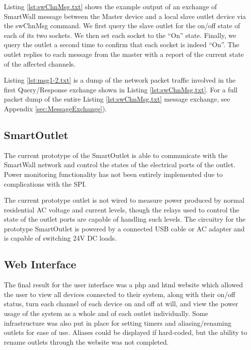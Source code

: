 \documentclass[11pt]{article}
\begin{document}


Listing \ref{lst:swChnMsg.txt} shows the example output of an exchange
of SmartWall message between the Master device and a local slave
outlet device via the swChnMsg command. We first query the slave
outlet for the on/off state of each of its two sockets. We then set
each socket to the ``On'' state. Finally, we query the outlet a second
time to confirm that each socket is indeed ``On''. The outlet replies
to each message from the master with a report of the current state of
the affected channels.



Listing \ref{lst:msg1-2.txt} is a dump of the network packet traffic
involved in the first Query/Response exchange shown in Listing
\ref{lst:swChnMsg.txt}. For a full packet dump of the entire
Listing \ref{lst:swChnMsg.txt} message exchange, see Appendix 
\ref{sec:MessageExchange}).



\subsection{SmartOutlet}
The current prototype of the SmartOutlet is able to communicate with
the SmartWall network and control the states of the electrical ports of the
outlet. Power monitoring functionality has not been entirely
implemented due to complications with the SPI.

The current prototype
outlet is not wired to measure power produced by normal residential AC
voltage and current levels, though the relays used to
control the state of the outlet ports are capable of handling such
levels.  The circuitry for the prototype SmartOutlet is powered by a
connected USB cable or AC adapter and is capable of switching 24V DC
loads.

\subsection{Web Interface}

The final result for the user interface was a php and html website
which allowed the user to view all devices connected to their system,
along with their on/off status, turn each channel of each device on
and off at will, and view the power usage of the system as a whole
and of each outlet individually. Some infrastructure was also put in
place for setting timers and aliasing/renaming outlets for ease of
use. Aliases could be displayed if hard-coded, but the ability to
rename outlets through the website was not completed.
\end{document}
